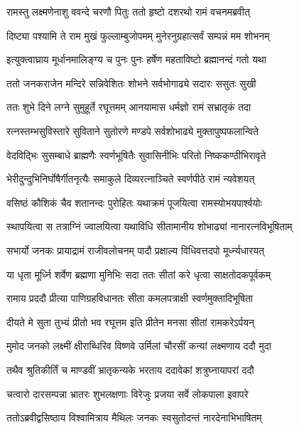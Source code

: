 \twolineshloka
{रामस्तु लक्ष्मणेनाशु ववन्दे चरणौ पितुः}
{ततो हृष्टो दशरथो रामं वचनमब्रवीत्} %

\twolineshloka
{दिष्ट्या पश्यामि ते राम मुखं फुल्लाम्बुजोपमम्}
{मुनेरनुग्रहात्सर्वं सम्पन्नं मम शोभनम्} %

\twolineshloka
{इत्युक्त्वाघ्राय मूर्धानमालिङ्ग्य च पुनः पुनः}
{हर्षेण महताविष्टो ब्रह्मानन्दं गतो यथा} %

\twolineshloka
{ततो जनकराजेन मन्दिरे सन्निवेशितः}
{शोभने सर्वभोगाढ्ये सदारः ससुतः सुखी} %

\twolineshloka
{ततः शुभे दिने लग्ने सुमुहूर्ते रघूत्तमम्}
{आनयामास धर्मज्ञो रामं सभ्रातृकं तदा} %

\twolineshloka
{रत्नस्तम्भसुविस्तारे सुविताने सुतोरणे}
{मण्डपे सर्वशोभाढ्ये मुक्तापुष्पफलान्विते} %

\twolineshloka
{वेदविद्भिः सुसम्बाधे ब्राह्मणैः स्वर्णभूषितैः}
{सुवासिनीभिः परितो निष्ककण्ठीभिरावृते} %

\twolineshloka
{भेरीदुन्दुभिनिर्घोषैर्गीतनृत्यैः समाकुले}
{दिव्यरत्नाञ्चिते स्वर्णपीठे रामं न्यवेशयत्} %

\twolineshloka
{वसिष्ठं कौशिकं चैव शतानन्दः पुरोहितः}
{यथाक्रमं पूजयित्वा रामस्योभयपार्श्वयोः} %

\twolineshloka
{स्थापयित्वा स तत्राग्निं ज्वालयित्वा यथाविधि}
{सीतामानीय शोभाढ्यां नानारत्नविभूषिताम्} %

\twolineshloka
{सभार्यो जनकः प्रायाद्रामं राजीवलोचनम्}
{पादौ प्रक्षाल्य विधिवत्तदपो मूर्ध्न्यधारयत्} %

\twolineshloka
{या धृता मूर्ध्नि शर्वेण ब्रह्मणा मुनिभिः सदा}
{ततः सीतां करे धृत्वा साक्षतोदकपूर्वकम्} %

\twolineshloka
{रामाय प्रददौ प्रीत्या पाणिग्रहविधानतः}
{सीता कमलपत्राक्षी स्वर्णमुक्तादिभूषिता} %

\twolineshloka
{दीयते मे सुता तुभ्यं प्रीतो भव रघूत्तम}
{इति प्रीतेन मनसा सीतां रामकरेऽर्पयन्} %

\twolineshloka
{मुमोद जनको लक्ष्मीं क्षीराब्धिरिव विष्णवे}
{उर्मिलां चौरसीं कन्यां लक्ष्मणाय ददौ मुदा} %

\twolineshloka
{तथैव श्रुतिकीर्तिं च माण्डवीं भ्रातृकन्यके}
{भरताय ददावेकां शत्रुघ्नायापरां ददौ} %

\twolineshloka
{चत्वारो दारसम्पन्ना भ्रातरः शुभलक्षणाः}
{विरेजुः प्रजया सर्वे लोकपाला इवापरे} %

\twolineshloka
{ततोऽब्रवीद्वसिष्ठाय विश्वामित्राय मैथिलः}
{जनकः स्वसुतोदन्तं नारदेनाभिभाषितम्} %

